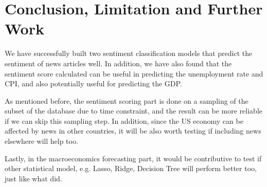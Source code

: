 \documentclass[11pt,a4paper]{article}
\begin{document}
\section{Conclusion, Limitation and Further Work}

We have successfully built two sentiment classification models that predict the sentiment of news articles well. In addition, we have also found that the sentiment score calculated can be useful in predicting the unemployment rate and CPI, and also potentially useful for predicting the GDP.

As mentioned before, the sentiment scoring part is done on a sampling of the subset of the database due to time constraint, and the result can be more reliable if we can skip this sampling step. In addition, since the US economy can be affected by news in other countries, it will be also worth testing if including news elsewhere will help too.

Lastly, in the macroeconomics forecasting part, it would be contributive to test if other statistical model, e.g. Lasso, Ridge, Decision Tree will perform better too, just like what \cite{P6} did.




\end{document}
